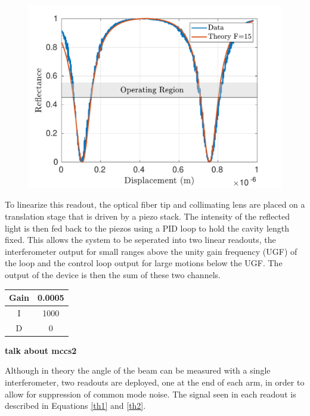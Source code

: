 \documentclass [12pt, proquest]{uwthesis}[2019]
\begin{document}
\begin{figure}%
\begin{center}
 \includegraphics[width=\textwidth]{cBRS_Fringes.pdf}
\caption{}
\label{cBRS_fringes}
\end{center}
\end{figure}

To linearize this readout, the optical fiber tip and collimating lens are placed on a translation stage that is driven by a piezo stack. The intensity of the reflected light is then fed back to the piezos using a PID loop to hold the cavity length fixed. This allows the system to be seperated into two linear readouts, the interferometer output for small ranges above the unity gain frequency (UGF) of the loop and the control loop output for large motions below the UGF. The output of the device is then the sum of these two channels.

\begin{center}
\begin{tabular}{| c | c |}
\hline
Gain & 0.0005\\
\hline
I & 1000\\
\hline
D & 0\\
\hline
\end{tabular}
\label{pidTable}
\end{center}

\textbf{talk about mccs2}

Although in theory the angle of the beam can be measured with a single interferometer, two readouts are deployed, one at the end of each arm, in order to allow for suppression of common mode noise. The signal seen in each readout is described in Equations \ref{th1} and \ref{th2}. 
\end{document}

